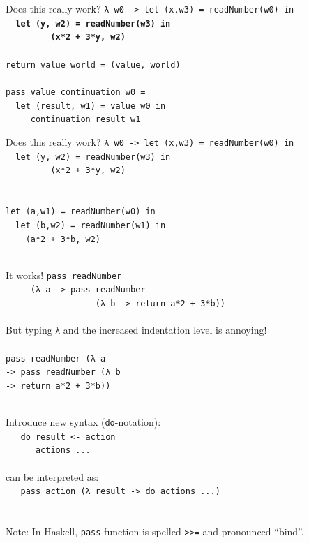 \documentclass{beamer}
\begin{document}
\begin{frame}{Does this really work?}
  \texttt{λ w0 -> let (x,w3) = readNumber(w0) in\\
    \ \ \textbf{let (y, w2) = readNumber(w3) in\\
      \ \ \ \ \ \ \ \ \ (x*2 + 3*y, w2)}\\
    \ \\
    return value world = (value, world) \\
    \ \\
    pass value continuation w0 = \\
    \ \ let (result, w1) = value w0 in \\
    \ \ \ \ \ continuation result w1
  }
\end{frame}

\begin{frame}{Does this really work?}
  \texttt{λ w0 -> let (x,w3) = readNumber(w0) in\\
    \ \ let (y, w2) = readNumber(w3) in\\
      \ \ \ \ \ \ \ \ \ (x*2 + 3*y, w2)\\
    \ \\ \ \\
    let (a,w1) = readNumber(w0) in \\
    \ \ let (b,w2) = readNumber(w1) in \\
    \ \ \ \ (a*2 + 3*b, w2) \\
    \ 
  }
\end{frame}


\begin{frame}{It works!}
  \texttt{pass readNumber \\
    \ \ \ \ \ (λ a -> pass readNumber \\
    \ \ \ \ \ \ \ \ \ \ \ \ \ \ \ \ \ \ (λ b -> return a*2 + 3*b))
  } \\ \ \\ \pause
  But typing λ and the increased indentation level is annoying! \\ \pause
  \ \\
  \texttt{pass readNumber (λ a \\
    -> pass readNumber (λ b \\
    -> return a*2 + 3*b))
  } 
\end{frame}

\begin{frame}
  \ \\ Introduce new syntax (\texttt{do}-notation): \\
  \texttt{
    \ \ do result <- action \\
    \ \ \ \ \ \ actions  ... \\
  } \ \\ \pause
  can be interpreted as: \\ \pause
  \texttt{
    \ \ pass action (λ result -> do actions ...) \\
  } \ \\  \pause
  \ \\
  Note: In Haskell, \texttt{pass} function is spelled
  \texttt{>>=} and pronounced ``bind''.
\end{frame}
\end{document}
